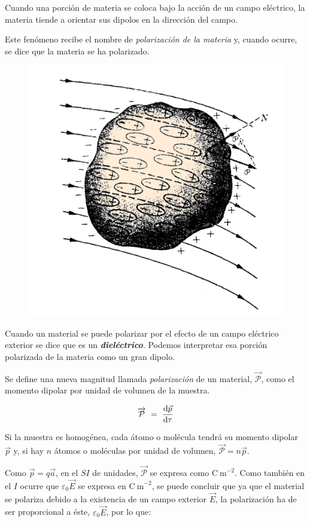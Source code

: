 \begin{multicols}{2}
Cuando una porción de materia se coloca bajo la acción de un campo eléctrico, la materia tiende a orientar sus dipolos en la dirección del campo. 

Este fenómeno recibe el nombre de \emph{polarización de la materia} y, cuando ocurre, se dice que la materia se ha polarizado.
\begin{figure}[H]
	\centering
	\includegraphics[width=.5\textwidth]{imagenes/imagenes24/T24IM07.png}
\end{figure}
\end{multicols}

Cuando un material se puede polarizar por el efecto de un campo eléctrico exterior se dice que es un \emph{\textbf{dieléctrico}}. Podemos interpretar esa porción polarizada de la materia como un gran dipolo.

Se define una nueva magnitud llamada \emph{polarización} de un material, $\overrightarrow{\mathcal P}$, como el momento dipolar por unidad de volumen de la muestra.

\begin{equation}
	\overrightarrow{\mathcal P} \ = \ \dv{\vec p}{\tau}
\end{equation}

Si la muestra es homogénea, cada átomo o molécula tendrá su momento dipolar $\vec p$ y, si hay $n$ átomos o moléculas por unidad de volumen, $\overrightarrow{\mathcal P}=n\vec p$.

Como $\vec p=q\vec a$, en el $SI$ de unidades, $\overrightarrow{\mathcal P}$ se expresa como $\mathrm{C\ m}^{-2}$. Como también en el $I$ ocurre que $\varepsilon_0 \vec E$ se expresa en $\mathrm{C\ m}^{-2}$, se puede concluir que ya que el material se polariza debido a la existencia de un campo exterior $\vec E$, la polarización ha de ser proporcional a éste, $\varepsilon_0 \vec E$, por lo que:

